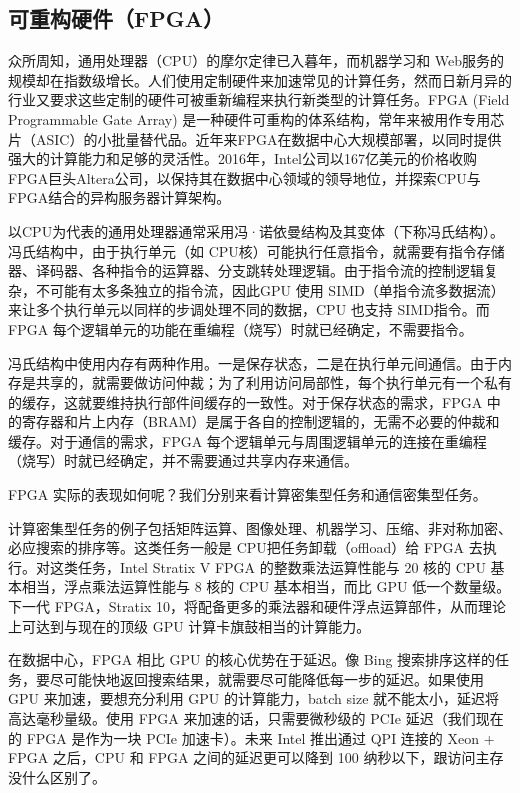 \subsection{可重构硬件（FPGA）}
\label{smartnic-fpga}

众所周知，通用处理器（CPU）的摩尔定律已入暮年，而机器学习和 Web服务的规模却在指数级增长。人们使用定制硬件来加速常见的计算任务，然而日新月异的行业又要求这些定制的硬件可被重新编程来执行新类型的计算任务。FPGA (Field Programmable Gate Array) 是一种硬件可重构的体系结构，常年来被用作专用芯片（ASIC）的小批量替代品。近年来FPGA在数据中心大规模部署，以同时提供强大的计算能力和足够的灵活性。2016年，Intel公司以167亿美元的价格收购FPGA巨头Altera公司，以保持其在数据中心领域的领导地位，并探索CPU与FPGA结合的异构服务器计算架构。


以CPU为代表的通用处理器通常采用冯·诺依曼结构及其变体（下称冯氏结构）。冯氏结构中，由于执行单元（如 CPU核）可能执行任意指令，就需要有指令存储器、译码器、各种指令的运算器、分支跳转处理逻辑。由于指令流的控制逻辑复杂，不可能有太多条独立的指令流，因此GPU 使用 SIMD（单指令流多数据流）来让多个执行单元以同样的步调处理不同的数据，CPU 也支持 SIMD指令。而 FPGA 每个逻辑单元的功能在重编程（烧写）时就已经确定，不需要指令。

冯氏结构中使用内存有两种作用。一是保存状态，二是在执行单元间通信。由于内存是共享的，就需要做访问仲裁；为了利用访问局部性，每个执行单元有一个私有的缓存，这就要维持执行部件间缓存的一致性。对于保存状态的需求，FPGA 中的寄存器和片上内存（BRAM）是属于各自的控制逻辑的，无需不必要的仲裁和缓存。对于通信的需求，FPGA 每个逻辑单元与周围逻辑单元的连接在重编程（烧写）时就已经确定，并不需要通过共享内存来通信。

FPGA 实际的表现如何呢？我们分别来看计算密集型任务和通信密集型任务。

计算密集型任务的例子包括矩阵运算、图像处理、机器学习、压缩、非对称加密、必应搜索的排序等。这类任务一般是 CPU把任务卸载（offload）给 FPGA 去执行。对这类任务，Intel Stratix V FPGA 的整数乘法运算性能与 20 核的 CPU 基本相当，浮点乘法运算性能与 8 核的 CPU 基本相当，而比 GPU 低一个数量级。下一代 FPGA，Stratix 10，将配备更多的乘法器和硬件浮点运算部件，从而理论上可达到与现在的顶级 GPU 计算卡旗鼓相当的计算能力。

在数据中心，FPGA 相比 GPU 的核心优势在于延迟。像 Bing 搜索排序这样的任务，要尽可能快地返回搜索结果，就需要尽可能降低每一步的延迟。如果使用 GPU 来加速，要想充分利用 GPU 的计算能力，batch size 就不能太小，延迟将高达毫秒量级。使用 FPGA 来加速的话，只需要微秒级的 PCIe 延迟（我们现在的 FPGA 是作为一块 PCIe 加速卡）。未来 Intel 推出通过 QPI 连接的 Xeon + FPGA 之后，CPU 和 FPGA 之间的延迟更可以降到 100 纳秒以下，跟访问主存没什么区别了。

